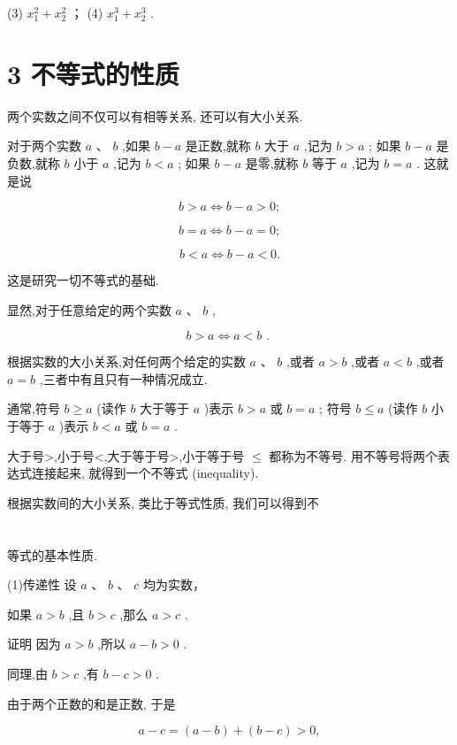 \documentclass[10pt]{article}
\begin{document}
(3) \({x}_{1}^{2} + {x}_{2}^{2}\) ； (4) \({x}_{1}^{3} + {x}_{2}^{3}\) .

\section*{3 不等式的性质}

两个实数之间不仅可以有相等关系, 还可以有大小关系.

对于两个实数 \(a\text{ 、 }b\) ,如果 \(b - a\) 是正数,就称 \(b\) 大于 \(a\) ,记为 \(b > a\) ; 如果 \(b - a\) 是负数,就称 \(b\) 小于 \(a\) ,记为 \(b < a\) ; 如果 \(b - a\) 是零,就称 \(b\) 等于 \(a\) ,记为 \(b = a\) . 这就是说

\[
b > a \Leftrightarrow  b - a > 0;
\]

\[
b = a \Leftrightarrow  b - a = 0;
\]

\[
b < a \Leftrightarrow  b - a < 0.
\]

这是研究一切不等式的基础.

显然,对于任意给定的两个实数 \(a\text{ 、 }b\) ,

\[
b > a \Leftrightarrow  a < b\text{ . }
\]

根据实数的大小关系,对任何两个给定的实数 \(a\text{ 、 }b\) ,或者 \(a > b\) ,或者 \(a < b\) ,或者 \(a = b\) ,三者中有且只有一种情况成立.

通常,符号 \(b \geq  a\) (读作 \(b\) 大于等于 \(a\) )表示 \(b > a\) 或 \(b = a\) ; 符号 \(b \leq  a\) (读作 \(b\) 小于等于 \(a\) )表示 \(b < a\) 或 \(b = a\) .

大于号>,小于号<,大于等于号>,小于等于号 \(\leq\) 都称为不等号. 用不等号将两个表达式连接起来, 就得到一个不等式 (inequality).

根据实数间的大小关系, 类比于等式性质, 我们可以得到不

\section*{}

等式的基本性质.

(1)传递性 设 \(a\text{ 、 }b\text{ 、 }c\) 均为实数，

如果 \(a > b\) ,且 \(b > c\) ,那么 \(a > c\) .

证明 因为 \(a > b\) ,所以 \(a - b > 0\) .

同理,由 \(b > c\) ,有 \(b - c > 0\) .

由于两个正数的和是正数, 于是

\[
a - c = \left( {a - b}\right)  + \left( {b - c}\right)  > 0,
\]
\end{document}
